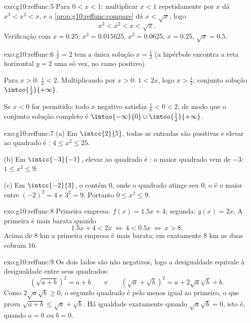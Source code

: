 \begin{solution}{exo:g10:reffunc:5}
Para $0 < x < 1$: multiplicar $x < 1$ repetidamente por $x$ dá
$x^3 < x^2 < x$, e a \cref{prop:g10:reffunc:compare} dá $x < \sqrt x$,
logo
\[
x^3 < x^2 < x < \sqrt x .
\]
Verificação com $x = 0.25$: $x^3 = 0.015625$, $x^2 = 0.0625$, $x = 0.25$,
$\sqrt x = 0.5$.
\end{solution}

\begin{solution}{exo:g10:reffunc:6}
$\frac1x = 2$ tem a única solução $x = \frac12$ (a hipérbole encontra a
reta horizontal $y = 2$ uma só vez, no ramo positivo).

Para $x > 0$: $\frac1x < 2$. Multiplicando por $x > 0$: $1 < 2x$, logo
$x > \frac12$: conjunto solução $\intoo{\frac12}{+\infty}$.

Se $x < 0$ for permitido: todo $x$ negativo satisfaz $\frac1x < 0 < 2$,
de modo que o conjunto solução completo é
$\intoo{-\infty}{0} \cup \intoo{\frac12}{+\infty}$.
\end{solution}

\begin{solution}{exo:g10:reffunc:7}
(a) Em $\intcc{2}{5}$, todas as entradas são positivas e elevar ao
quadrado é : $4 \leq x^2 \leq 25$.

(b) Em $\intcc{-3}{-1}$, elevar ao quadrado é : o maior
quadrado vem de $-3$: $1 \leq x^2 \leq 9$.

(c) Em $\intcc{-2}{3}$, o  contém $0$, onde o quadrado atinge
seu  $0$; o  é o maior entre $(-2)^2 = 4$ e $3^2 = 9$.
Portanto $0 \leq x^2 \leq 9$.
\end{solution}

\begin{solution}{exo:g10:reffunc:8}
Primeira empresa: $f(x) = 1.5x + 4$; segunda: $g(x) = 2x$. A primeira é
mais barata quando
\[
1.5x + 4 < 2x
\ \Longleftrightarrow\
4 < 0.5x
\ \Longleftrightarrow\
x > 8 .
\]
Acima de $8$ km a primeira empresa é mais barata; em exatamente $8$ km
as duas cobram $16$.
\end{solution}

\begin{solution}{exo:g10:reffunc:9}
Os dois lados são não negativos, logo a desigualdade equivale à
desigualdade entre seus quadrados:
\[
\left(\sqrt{a+b}\right)^2 = a + b
\qquad\text{e}\qquad
\left(\sqrt a + \sqrt b\right)^2 = a + 2\sqrt a \sqrt b + b .
\]
Como $2\sqrt a\sqrt b \geq 0$, o segundo quadrado é pelo menos igual ao
primeiro, o que prova $\sqrt{a+b} \leq \sqrt a + \sqrt b$. Há igualdade
exatamente quando $\sqrt a \sqrt b = 0$, isto é, quando $a = 0$ ou
$b = 0$.
\end{solution}

